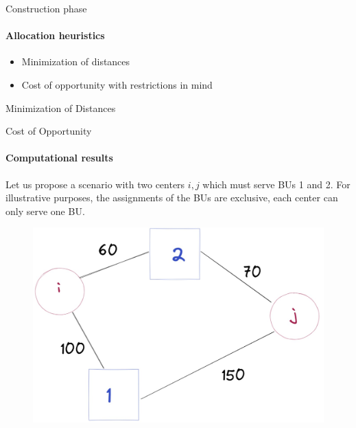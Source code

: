 \documentclass{beamer}
\begin{document}
\begin{frame}{Construction phase}
    \framesubtitle{Allocation heuristics}
    \begin{itemize}
        \item Minimization of distances
        \item Cost of opportunity with restrictions in mind
    \end{itemize}
\end{frame}

\begin{frame}{Minimization of Distances}
\end{frame}

\begin{frame}{Cost of Opportunity}
    \framesubtitle{Computational results}
    Let us propose a scenario with two centers $i, j$ which must serve BUs 1 and 2. For illustrative purposes, the assignments of the BUs are exclusive, each center can only serve one BU.
    \begin{figure}
        \centering
        \includegraphics[scale=0.25]{datos_1_opp}
    \end{figure}
\end{frame}
\end{document}

